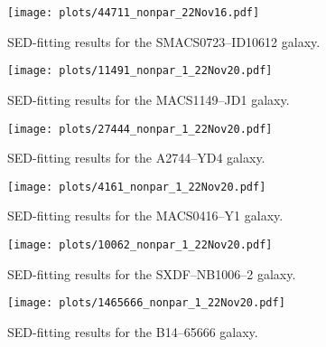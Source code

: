 \documentclass[twocolumn]{aastex631}
\begin{document}
\begin{figure*}
    \centering
    \texttt{[image: plots/44711\_nonpar\_22Nov16.pdf]}
    \caption{SED-fitting results for the SMACS0723--ID10612 galaxy.}
    \label{fig: 10612}
\end{figure*}

\begin{figure*}
    \centering
    \texttt{[image: plots/11491\_nonpar\_1\_22Nov20.pdf]}
    \caption{SED-fitting results for the MACS1149--JD1 galaxy.}
    \label{fig: MACS1149--JD1}
\end{figure*}

\begin{figure*}
    \centering
    \texttt{[image: plots/27444\_nonpar\_1\_22Nov20.pdf]}
    \caption{SED-fitting results for the A2744--YD4 galaxy.}
    \label{fig: A2744--YD4}
\end{figure*}

\begin{figure*}
    \centering
    \texttt{[image: plots/4161\_nonpar\_1\_22Nov20.pdf]}
    \caption{SED-fitting results for the MACS0416--Y1 galaxy.}
    \label{fig: MACS0416--Y1}
\end{figure*}

\begin{figure*}
    \centering
    \texttt{[image: plots/10062\_nonpar\_1\_22Nov20.pdf]}
    \caption{SED-fitting results for the SXDF--NB1006--2 galaxy.}
    \label{fig: SXDF--NB1006--2}
\end{figure*}

\begin{figure*}
    \centering
    \texttt{[image: plots/1465666\_nonpar\_1\_22Nov20.pdf]}
    \caption{SED-fitting results for the B14--65666 galaxy.}
    \label{fig: B14--65666}
\end{figure*}
\end{document}
